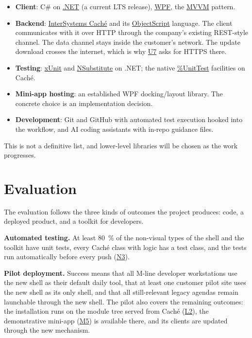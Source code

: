 \documentclass{article}
\newcommand{\req}[1]{\hyperlink{req:#1}{#1}}
\begin{document}
\begin{itemize}
  \item \textbf{Client}: C\# on \href{https://dotnet.microsoft.com/}{.NET} (a current LTS release), \href{https://learn.microsoft.com/en-us/dotnet/desktop/wpf/}{WPF}, the \href{https://en.wikipedia.org/wiki/Model-view-viewmodel}{MVVM} pattern.
  \item \textbf{Backend}: \href{https://en.wikipedia.org/wiki/InterSystems_Cach%C3%A9}{InterSystems Caché} and its \href{https://en.wikipedia.org/wiki/Cach%C3%A9_ObjectScript}{ObjectScript} language. The client communicates with it over HTTP through the company's existing REST-style channel. The data channel stays inside the customer's network. The update download crosses the internet, which is why \req{U7} asks for HTTPS there.
  \item \textbf{Testing}: \href{https://xunit.net/}{xUnit} and \href{https://nsubstitute.github.io/}{NSubstitute} on .NET; the native \href{https://docs.intersystems.com/latest/csp/docbook/DocBook.UI.Page.cls?KEY=TUNT}{\%UnitTest} facilities on Caché.
  \item \textbf{Mini-app hosting}: an established WPF docking/layout library. The concrete choice is an implementation decision.
  \item \textbf{Development}: Git and GitHub with automated test execution hooked into the workflow, and AI coding assistants with in-repo guidance files.
\end{itemize}

\noindent This is not a definitive list, and lower-level libraries will be chosen as the work progresses.

\section{Evaluation}
\label{sec:evaluation}

The evaluation follows the three kinds of outcomes the project produces: code, a deployed product, and a toolkit for developers.

\medskip
\noindent \textbf{Automated testing.} At least 80~\% of the non-visual types of the shell and the toolkit have unit tests, every Caché class with logic has a test class, and the tests run automatically before every push (\req{N3}).

\medskip
\noindent \textbf{Pilot deployment.} Success means that all M-line developer workstations use the new shell as their default daily tool, that at least one customer pilot site uses the new shell as its only shell, and that all still-relevant legacy agendas remain launchable through the new shell. The pilot also covers the remaining outcomes: the installation runs on the module tree served from Caché (\req{L2}), the demonstrative mini-app (\req{M5}) is available there, and its clients are updated through the new mechanism.
\end{document}

